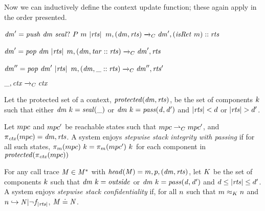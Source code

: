 \documentclass[acmsmall,review,anonymous]{acmart}\settopmatter{printfolios=true,printccs=false,printacmref=false}
\begin{document}
Now we can inductively define the context update function; these again apply in the order
presented. 

            {\(\mathit{dm}' = \mathit{push} ~ \mathit{dm} ~ \mathit{seal?} ~ P ~ m ~ |\mathit{rts}|\)}
            {\(m,(\mathit{dm},\mathit{rts}) \xrightarrow{}_C \mathit{dm}',(\mathit{isRet} ~ m)::\mathit{rts}\)}

\vspace*{-1ex}
            {\(\mathit{dm}' = \mathit{pop} ~ \mathit{dm} ~ |\mathit{rts}|\)}
            {\(m,(\mathit{dm},\mathit{tar}::\mathit{rts}) \xrightarrow{}_C \mathit{dm}',\mathit{rts}\)}

\vspace*{-1ex}
              {\(\mathit{dm}'' = \mathit{pop} ~ \mathit{dm}' ~ |\mathit{rts}|\)}
              {\(m,(\mathit{dm},\_::\mathit{rts}) \xrightarrow{}_C \mathit{dm}'',\mathit{rts}'\)}

\vspace*{-3.5ex}
\judgment[ Default]
         {}
         {\(\_,\mathit{ctx} \xrightarrow{}_C \mathit{ctx}\)}

 Let the protected set of a context, \(\mathit{protected}(\mathit{dm},\mathit{rts})\),
be the set of components \(k\) such that either \(\mathit{dm} ~ k = \mathit{seal(\_)}\)
or \(\mathit{dm} ~ k = \mathit{pass(d,d')}\) and \(|\mathit{rts}| < d\) or
\(|\mathit{rts}| > d'\).

Let \(mpc\) and \(mpc'\) be reachable states such that
\(mpc \overset{}{\rightharpoonup}_C mpc'\), and \(\pi_{\mathit{ctx}}(mpc) = \mathit{dm},\mathit{rts}\).
A system enjoys {\em stepwise stack integrity with passing} if for all
such states, \(\pi_m(mpc) ~ k = \pi_m(mpc') ~ k\)
for each component in \(\mathit{protected}(\pi_{\mathit{ctx}}(mpc))\)

For any call trace \(\mathit{M} \in \mathit{M}^*\) with \(\mathit{head}(\mathit{M}) = m,p,(\mathit{dm},\mathit{rts})\),
let \(K\) be the set of components \(k\) such that
\(\mathit{dm} ~ k = \mathit{outside}\) or \(\mathit{dm} ~ k = \mathit{pass(d,d')}\)
and \(d \leq |\mathit{rts}| \leq d'\). A system enjoys
\emph{stepwise stack confidentiality} if,
for all \(n\) such that \(m \approx_K n\) and
\(n \hookrightarrow \mathit{N} | \neg f_{|\mathit{rts}|}\),
\(\mathit{M} \doteq \mathit{N}\).
\end{document}
